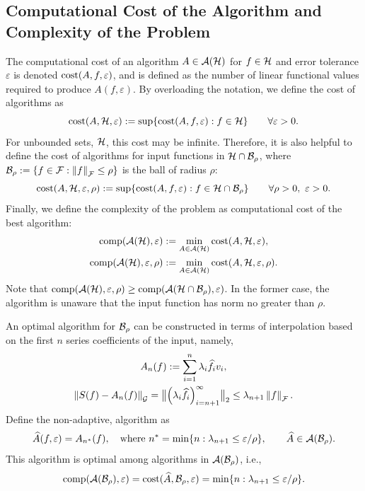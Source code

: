 \documentclass[graybox,footinfo]{svmult}
\newcommand{\DHJRnorm}[2][{}]{\ensuremath{\left \lVert #2 \right \rVert}_{#1}}
\newcommand{\DHJRbignorm}[2][{}]{\ensuremath{\bigl \lVert #2 \bigr \rVert}_{#1}}
\begin{document}
\subsection{Computational Cost of the Algorithm and Complexity of the Problem} The computational cost of an algorithm $A \in {\mathcal{A}}({\mathcal{H}})$ for $f \in {\mathcal{H}}$ and error tolerance $\varepsilon$ is denoted $\textup{cost}(A,f,\varepsilon)$, and is defined as the number of linear functional values required to produce $A(f,\varepsilon)$.  By overloading the notation, we define the cost of algorithms as 
\begin{equation*}
\textup{cost}(A,{\mathcal{H}},\varepsilon) : = \sup \{\textup{cost}(A,f,\varepsilon) : f \in {\mathcal{H}} \} \qquad \forall \varepsilon > 0.
\end{equation*}
For unbounded sets, ${\mathcal{H}}$, this cost may be infinite.  Therefore, it is also helpful to define the cost of algorithms for input functions in ${\mathcal{H}} \cap {\mathcal{B}}_{\rho}$, where $\calB_{\rho} : = \{ f \in \calF : \DHJRnorm[\calF]{f} \le \rho \}$ is the ball of radius $\rho$:
\begin{equation*}
\textup{cost}(A,{\mathcal{H}},\varepsilon,\rho) : = \sup \{\textup{cost}(A,f,\varepsilon) : f \in {\mathcal{H}} \cap {\mathcal{B}}_{\rho} \} \qquad \forall \rho > 0, \ \varepsilon > 0.
\end{equation*}
Finally, we define the complexity of the problem as computational cost of the best algorithm:
\begin{gather*}
\textup{comp}({\mathcal{A}}({\mathcal{H}}),\varepsilon) := \min_{A \in {\mathcal{A}}({\mathcal{H}})} \textup{cost}(A, {\mathcal{H}}, \varepsilon), \\
\textup{comp}({\mathcal{A}}({\mathcal{H}}),\varepsilon,\rho) := \min_{A \in {\mathcal{A}}({\mathcal{H}})} \textup{cost}(A, {\mathcal{H}}, \varepsilon, \rho).
\end{gather*}
Note that $\textup{comp}({\mathcal{A}}({\mathcal{H}}),\varepsilon,\rho) \ge \textup{comp}({\mathcal{A}}({\mathcal{H}} \cap {\mathcal{B}}_{\rho}),\varepsilon)$.  In the former case, the algorithm is unaware  that the input function has norm no greater than $\rho$.  

An optimal algorithm for ${\mathcal{B}}_{\rho}$ can be constructed in terms of interpolation based on the first $n$ series coefficients of the input, namely,
\begin{gather}  \label{optAdef}
A_n(f) := \sum_{i=1}^n \lambda_{i} \widehat{f}_{i} v_{i}, \\
\label{errOpt}
\DHJRnorm[\calG]{S(f) - A_n(f)} = \DHJRbignorm[2]{\left(\lambda_{i} \widehat{f}_{i} \right)_{i= n+1}^{\infty}} \le \lambda_{n+1} \DHJRnorm[\calF]{f}.
\end{gather}
Define the non-adaptive, algorithm as
\begin{equation} \label{optBallalg}
\widehat{A}(f,\varepsilon) = A_{n^*}(f), \quad \text{where } n^* = \min\{ n : \lambda_{n+1} \le \varepsilon/\rho \}, \qquad \widehat{A} \in \calA(\calB_{\rho}).
\end{equation}
This algorithm is optimal among algorithms in ${\mathcal{A}}({\mathcal{B}}_{\rho})$, i.e.,
\[
\textup{comp}({\mathcal{A}}({\mathcal{B}}_{\rho}),\varepsilon) = \textup{cost}(\widehat{A},{\mathcal{B}}_{\rho},\varepsilon) =
\min\{ n : \lambda_{n+1} \le \varepsilon/\rho \}.
\]
\end{document}
